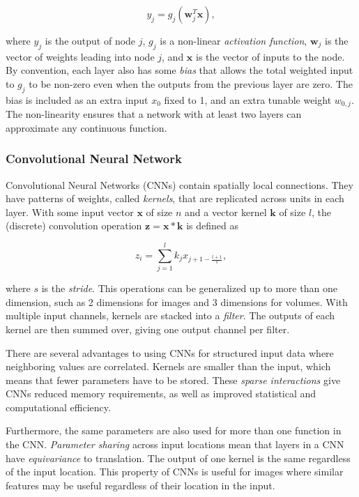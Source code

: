 \begin{equation}
    y_j = g_j(\mathbf{w}_j^T \mathbf{x}),
\end{equation}

where \(y_j\) is the output of node \(j\), \(g_j\) is a non-linear \textit{activation function}, \(\mathbf{w}_j\) is the vector of weights leading into node \(j\), and \(\mathbf{x}\) is the vector of inputs to the node.
By convention, each layer also has some \textit{bias} that allows the total weighted input to \(g_j\) to be non-zero even when the outputs from the previous layer are zero.
The bias is included as an extra input \(x_0\) fixed to 1, and an extra tunable weight \(w_{0,j}\).
The non-linearity ensures that a network with at least two layers can approximate any continuous function.~\cite{russell_artificial_2021}

\subsubsection{Convolutional Neural Network}

Convolutional Neural Networks (CNNs) contain spatially local connections.
They have patterns of weights, called \textit{kernels}, that are replicated across units in each layer.
With some input vector \(\mathbf{x}\) of size \(n\) and a vector kernel \(\mathbf{k}\) of size \(l\), the (discrete) convolution operation \(\mathbf{z} = \mathbf{x} \ast \mathbf{k}\) is defined as

\begin{equation}
    z_i = \sum_{j=1}^l k_j x_{j+1-\frac{l+1}{s}},
\end{equation}

where \(s\) is the \textit{stride}.
This operations can be generalized up to more than one dimension, such as 2 dimensions for images and 3 dimensions for volumes.
With multiple input channels, kernels are stacked into a \textit{filter}.
The outputs of each kernel are then summed over, giving one output channel per filter.

There are several advantages to using CNNs for structured input data where neighboring values are correlated.
Kernels are smaller than the input, which means that fewer parameters have to be stored.
These \textit{sparse interactions} give CNNs reduced memory requirements,
as well as improved statistical and computational efficiency.

Furthermore, the same parameters are also used for more than one function in the CNN. \textit{Parameter sharing} across input locations mean that layers in a CNN have \textit{equivariance} to translation. 
The output of one kernel is the same regardless of the input location.
This property of CNNs is useful for images where similar features may be useful regardless of their location in the input.~\cite{goodfellow_deep_2016}

